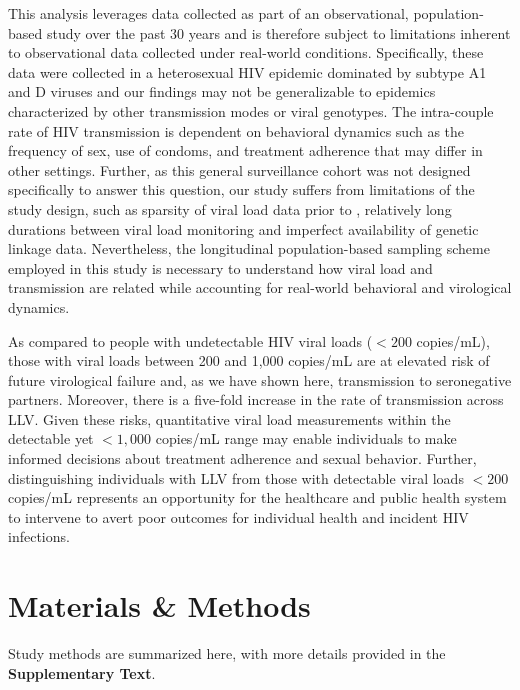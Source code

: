 \documentclass{article}[11pt]
\newcommand{\var}[1]{\DTLfetch{\mydata}{var}{#1}{val}}
\begin{document}
This analysis leverages data collected as part of an observational, population-based study over the past 30 years and is therefore subject to limitations inherent to observational data collected under real-world conditions.  Specifically, these data were collected in a heterosexual HIV epidemic dominated by subtype A1 and D viruses and our findings may not be generalizable to epidemics characterized by other transmission modes or viral genotypes. The intra-couple rate of HIV transmission is dependent on behavioral dynamics such as the frequency of sex, use of condoms, and treatment adherence that may differ in other settings. Further, as this general surveillance cohort was not designed specifically to answer this question, our study suffers from limitations of the study design, such as sparsity of viral load data prior to \var{r16_minYear}, relatively long durations between viral load monitoring and imperfect availability of genetic linkage data. Nevertheless, the longitudinal population-based sampling scheme employed in this study is necessary to understand how viral load and transmission are related while accounting for real-world behavioral and virological dynamics.   

As compared to people with undetectable HIV viral loads ($<200$ copies/mL), those with viral loads between 200 and 1,000 copies/mL are at elevated risk of future virological failure and, as we have shown here, transmission to seronegative partners. Moreover, there is a five-fold increase in the rate of transmission across LLV. Given these risks, quantitative viral load measurements within the detectable yet $<1,000$ copies/mL range may enable individuals to make informed decisions about treatment adherence and sexual behavior. Further, distinguishing individuals with LLV from those with detectable viral loads $<200$ copies/mL represents an opportunity for the healthcare and public health system to intervene to avert poor outcomes for individual health and incident HIV infections. 

\section*{Materials \& Methods}

Study methods are summarized here, with more details provided in the \textbf{Supplementary Text}.
\end{document}

